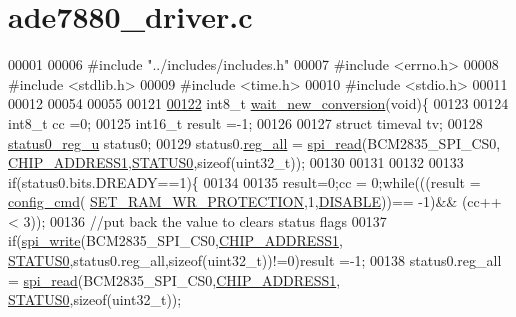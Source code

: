 \hypertarget{a00034}{\section{ade7880\-\_\-driver.\-c}
\label{db/df3/a00034}
}

\begin{DoxyCode}
00001 
00006 \textcolor{preprocessor}{#include "../includes/includes.h"}
00007 \textcolor{preprocessor}{#include <errno.h>}
00008 \textcolor{preprocessor}{#include <stdlib.h>}
00009 \textcolor{preprocessor}{#include <time.h>} 
00010 \textcolor{preprocessor}{#include <stdio.h>}    
00011 
00012 
00054 
00055 
00121 
\hypertarget{a00034_source_l00122}{}\hyperlink{a00002_ga7b6d584350762c53419945480d6958d3}{00122} int8\_t \hyperlink{a00002_ga7b6d584350762c53419945480d6958d3}{wait\_new\_conversion}(\textcolor{keywordtype}{void})\{
00123 
00124            int8\_t cc =0;
00125            int16\_t result =-1;
00126     
00127            \textcolor{keyword}{struct }timeval tv;
00128            \hyperlink{a00031}{status0\_reg\_u} status0;
00129            status0.\hyperlink{a00031_ae44a0232a79ff51b5ef7aa80e4b35470}{reg\_all} = \hyperlink{a00006_ga7ad9f65ee46aca507374096506a0b1c4}{spi\_read}(BCM2835\_SPI\_CS0,
      \hyperlink{a00036_a94de2b046db6e10257ef4481c0a15eaa}{CHIP\_ADDRESS1},\hyperlink{a00035_aaf584f70289e5fd799fef97c85bb97ee}{STATUS0},\textcolor{keyword}{sizeof}(uint32\_t));
00130           
00131            
00132         
00133            \textcolor{keywordflow}{if}(status0.bits.DREADY==1)\{
00134     
00135            result=0;cc = 0;\textcolor{keywordflow}{while}(((result = \hyperlink{a00004_ga369ee0e8379941cbc2c79b90ec3292da}{config\_cmd}(
      \hyperlink{a00042_a5b534b9caab512045a6e762f3930a501}{SET\_RAM\_WR\_PROTECTION},1,\hyperlink{a00036_a99496f7308834e8b220f7894efa0b6ab}{DISABLE}))== -1)&& (cc++ < 3));  
00136            \textcolor{comment}{//put back the value to clears status flags         }
00137            \textcolor{keywordflow}{if}(\hyperlink{a00006_ga2770219ad8ad1eda1817c0df934b47d0}{spi\_write}(BCM2835\_SPI\_CS0,\hyperlink{a00036_a94de2b046db6e10257ef4481c0a15eaa}{CHIP\_ADDRESS1},
      \hyperlink{a00035_aaf584f70289e5fd799fef97c85bb97ee}{STATUS0},status0.reg\_all,\textcolor{keyword}{sizeof}(uint32\_t))!=0)result =-1; 
00138            status0.reg\_all = \hyperlink{a00006_ga7ad9f65ee46aca507374096506a0b1c4}{spi\_read}(BCM2835\_SPI\_CS0,\hyperlink{a00036_a94de2b046db6e10257ef4481c0a15eaa}{CHIP\_ADDRESS1},
      \hyperlink{a00035_aaf584f70289e5fd799fef97c85bb97ee}{STATUS0},\textcolor{keyword}{sizeof}(uint32\_t));

\end{DoxyCode}
